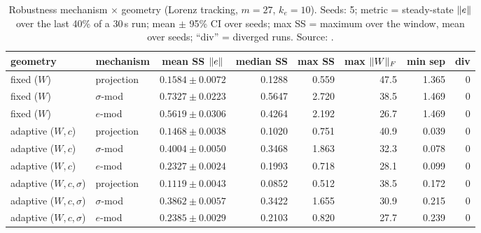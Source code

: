 \begin{table}[htbp]
\centering\small
\caption[Robustness mechanism $\times$ geometry]{Robustness mechanism $\times$ geometry (Lorenz tracking, $m=27$, $k_e=10$). Seeds: 5; metric =
steady-state $\lVert e\rVert$ over the last 40\% of a 30\,s run; mean $\pm$ 95\% CI over seeds; max SS = maximum over the
window, mean over seeds; ``div'' = diverged runs.
Source: .}\label{tab:part1:factorial}
\begin{tabular}{@{}llcrrrrr@{}}
\toprule
geometry & mechanism & mean SS $\lVert e\rVert$ & median SS & max SS & max $\lVert W\rVert_F$ & min sep & div\\
\midrule
fixed ($W$) & projection & $0.1584\pm0.0072$ & 0.1288 & 0.559 & 47.5 & 1.365 & 0\\
fixed ($W$) & $\sigma$-mod & $0.7327\pm0.0223$ & 0.5647 & 2.720 & 38.5 & 1.469 & 0\\
fixed ($W$) & $e$-mod & $0.5619\pm0.0306$ & 0.4264 & 2.192 & 26.7 & 1.469 & 0\\
\addlinespace
adaptive ($W,c$) & projection & $0.1468\pm0.0038$ & 0.1020 & 0.751 & 40.9 & 0.039 & 0\\
adaptive ($W,c$) & $\sigma$-mod & $0.4004\pm0.0050$ & 0.3468 & 1.863 & 32.3 & 0.078 & 0\\
adaptive ($W,c$) & $e$-mod & $0.2327\pm0.0024$ & 0.1993 & 0.718 & 28.1 & 0.099 & 0\\
\addlinespace
adaptive ($W,c,\sigma$) & projection & $0.1119\pm0.0043$ & 0.0852 & 0.512 & 38.5 & 0.172 & 0\\
adaptive ($W,c,\sigma$) & $\sigma$-mod & $0.3862\pm0.0057$ & 0.3422 & 1.655 & 30.9 & 0.215 & 0\\
adaptive ($W,c,\sigma$) & $e$-mod & $0.2385\pm0.0029$ & 0.2103 & 0.820 & 27.7 & 0.239 & 0\\
\bottomrule
\end{tabular}
\end{table}

